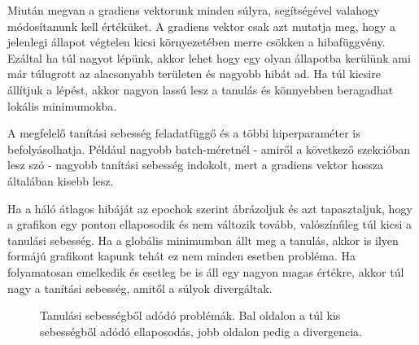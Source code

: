 Miután megvan a gradiens vektorunk minden súlyra, segítségével valahogy módosítanunk kell értéküket. A gradiens vektor csak azt mutatja meg, hogy a jelenlegi állapot végtelen kicsi környezetében merre csökken a hibafüggvény. Ezáltal ha túl nagyot lépünk, akkor lehet hogy egy olyan állapotba kerülünk ami már túlugrott az alacsonyabb területen és nagyobb hibát ad. Ha túl kicsire állítjuk a lépést, akkor nagyon lassú lesz a tanulás és könnyebben beragadhat lokális minimumokba.

A megfelelő tanítási sebesség feladatfüggő és a többi hiperparaméter is befolyásolhatja. Például nagyobb batch-méretnél - amiről a következő szekcióban lesz szó - nagyobb tanítási sebesség indokolt, mert a gradiens vektor hossza általában kisebb lesz. 

Ha a háló átlagos hibáját az epochok szerint ábrázoljuk és azt tapasztaljuk, hogy a grafikon egy ponton ellaposodik és nem változik tovább, valószínűleg túl kicsi a tanulási sebesség. Ha a globális minimumban állt meg a tanulás, akkor is ilyen formájú grafikont kapunk tehát ez nem minden esetben probléma. Ha folyamatosan emelkedik és esetleg be is áll egy nagyon magas értékre, akkor túl nagy a tanítási sebesség, amitől a súlyok divergáltak.  

\begin{figure}[H]
		\begin{subfigure}{\linewidth}
		\end{subfigure}
	\caption{Tanulási sebességből adódó problémák. Bal oldalon a túl kis sebességből adódó ellaposodás, jobb oldalon pedig a divergencia.  \label{divergence}}
\end{figure}

